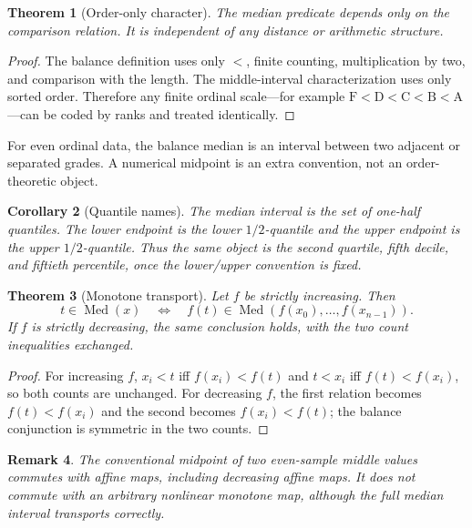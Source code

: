 \documentclass[11pt]{article}
\newtheorem{theorem}{Theorem}[section]
\newtheorem{corollary}[theorem]{Corollary}
\newtheorem{remark}[theorem]{Remark}
\newcommand{\Med}{\operatorname{Med}}
\begin{document}
\begin{theorem}[Order-only character]
The median predicate depends only on the comparison relation.  It is
independent of any distance or arithmetic structure.
\end{theorem}

\begin{proof}
The balance definition uses only $<$, finite counting, multiplication by two,
and comparison with the length.  The middle-interval characterization uses
only sorted order.  Therefore any finite ordinal scale---for example
$\mathrm F<\mathrm D<\mathrm C<\mathrm B<\mathrm A$---can be coded by ranks
and treated identically.
\end{proof}

For even ordinal data, the balance median is an interval between two adjacent
or separated grades.  A numerical midpoint is an extra convention, not an
order-theoretic object.

\begin{corollary}[Quantile names]
The median interval is the set of one-half quantiles.  The lower endpoint is
the lower $1/2$-quantile and the upper endpoint is the upper $1/2$-quantile.
Thus the same object is the second quartile, fifth decile, and fiftieth
percentile, once the lower/upper convention is fixed.
\end{corollary}

\begin{theorem}[Monotone transport]\label{thm:monotone}
Let $f$ be strictly increasing.  Then
\[
 t\in\Med(x)\quad\Longleftrightarrow\quad
 f(t)\in\Med(f(x_0),\ldots,f(x_{n-1})).
\]
If $f$ is strictly decreasing, the same conclusion holds, with the two count
inequalities exchanged.
\end{theorem}

\begin{proof}
For increasing $f$,
$x_i<t$ iff $f(x_i)<f(t)$ and $t<x_i$ iff $f(t)<f(x_i)$, so both counts are
unchanged.  For decreasing $f$, the first relation becomes
$f(t)<f(x_i)$ and the second becomes $f(x_i)<f(t)$; the balance conjunction is
symmetric in the two counts.
\end{proof}

\begin{remark}
The conventional midpoint of two even-sample middle values commutes with
\emph{affine} maps, including decreasing affine maps.  It does not commute
with an arbitrary nonlinear monotone map, although the full median interval
transports correctly.
\end{remark}
\end{document}
